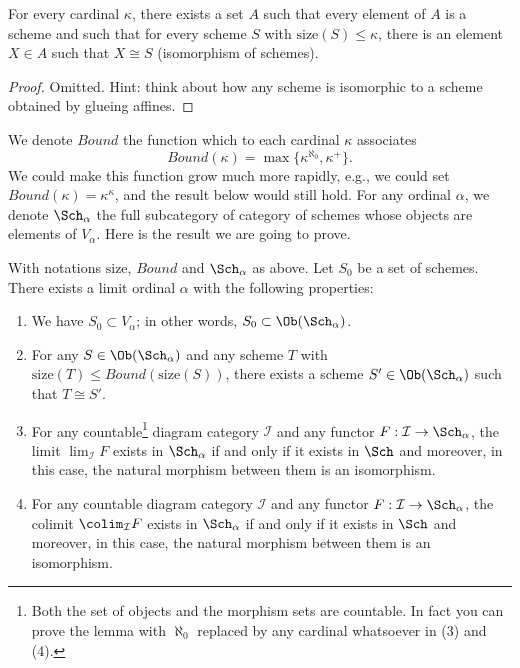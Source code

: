 \begin{lemma}
\label{lemma-bounded-size}
For every cardinal $\kappa$, there exists a set $A$ such
that every element of $A$ is a scheme and such that for every
scheme $S$ with $\text{size}(S) \leq \kappa$, there is
an element $X \in A$ such that $X \cong S$ (isomorphism
of schemes).
\end{lemma}

\begin{proof}
Omitted. Hint: think about how any scheme is isomorphic to a scheme
obtained by glueing affines.
\end{proof}

\noindent
We denote $Bound$ the function which to each
cardinal $\kappa$ associates
\begin{equation}
\label{equation-bound}
Bound(\kappa) = \max\{\kappa^{\aleph_0}, \kappa^+\}.
\end{equation}
We could make this function grow much more rapidly, e.g., we could
set $Bound(\kappa) = \kappa^\kappa$, and the result below would still hold.
For any ordinal $\alpha$, we denote $\Sch_\alpha$ the full
subcategory of category of schemes whose objects are elements of
$V_\alpha$. Here is the result we are going to prove.

\begin{lemma}
\label{lemma-construct-category}
With notations $\text{size}$, $Bound$ and $\Sch_\alpha$ as above.
Let $S_0$ be a set of schemes. There exists a limit ordinal
$\alpha$ with the following properties:
\begin{enumerate}
\item
\label{item-inclusion}
We have $S_0 \subset V_\alpha$; in other words,
$S_0 \subset \Ob(\Sch_\alpha)$.
\item
\label{item-bounded}
For any $S \in \Ob(\Sch_\alpha)$ and any
scheme $T$ with $\text{size}(T) \leq Bound(\text{size}(S))$,
there exists a scheme $S' \in \Ob(\Sch_\alpha)$
such that $T \cong S'$.
\item
\label{item-limit}
For any countable\footnote{Both the set of objects and
the morphism sets are countable. In fact you can prove the lemma with
$\aleph_0$ replaced by any cardinal whatsoever in (3) and (4).} diagram
category $\mathcal{I}$ and
any functor $F : \mathcal{I} \to \Sch_\alpha$, the limit
$\lim_\mathcal{I} F$ exists in $\Sch_\alpha$ if and
only if it exists in $\Sch$ and moreover, in this case,
the natural morphism between them is an isomorphism.
\item
\label{item-colimit}
For any countable diagram category $\mathcal{I}$ and
any functor $F : \mathcal{I} \to \Sch_\alpha$, the colimit
$\colim_\mathcal{I} F$ exists in $\Sch_\alpha$ if and
only if it exists in $\Sch$ and moreover, in this case,
the natural morphism between them is an isomorphism.
\end{enumerate}
\end{lemma}


